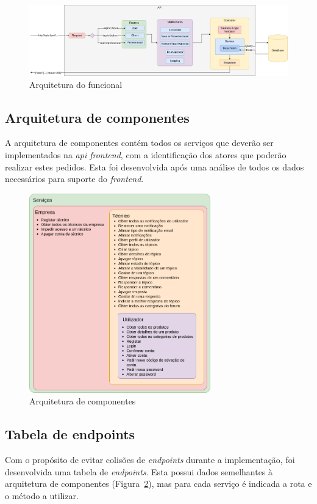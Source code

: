 \begin{figure}[htb]
  \centering
  \includegraphics[width=\textwidth]{images/Arquiteturas/arquitetura_funcional.png}
  \caption{Arquitetura do funcional}
  \label{fig:47}
\end{figure}

\newpage

\subsection{Arquitetura de componentes}
A arquitetura de componentes contém todos os serviços que deverão ser implementados na \textit{api frontend}, com a identificação dos atores que poderão realizar estes pedidos. Esta foi desenvolvida após uma análise de todos os dados necessários para suporte do \textit{frontend}.

\begin{figure}[htb]
  \centering
  \includegraphics[width=0.7\textwidth]{images/Arquiteturas/arquitetura_de_componentes_final.png}
  \caption{Arquitetura de componentes}
  \label{fig:48}
\end{figure}

\newpage

\subsection{Tabela de endpoints}
Com o propósito de evitar colisões de \textit{endpoints} durante a implementação, foi desenvolvida uma tabela de \textit{endpoints}. Esta possui dados semelhantes à arquitetura de componentes (Figura~\ref*{fig:48}), mas para cada serviço é indicada a rota e o método a utilizar.



\newpage
